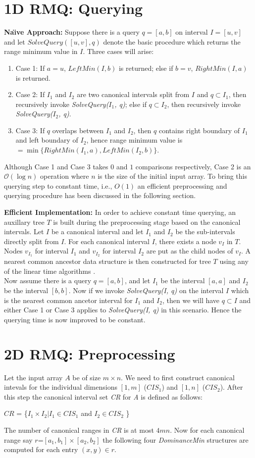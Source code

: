 \section{1D RMQ: Querying}
\textbf{Na\"{\i}ve Approach:} Suppose there is a query $q=[a, b]$ on interval $I=[u, v]$ and let $SolveQuery([u, v], q)$ denote the basic procedure which returns the range minimum value in $I$. Three cases will arise:
\begin{enumerate}
\item Case 1: If $a=u$, $LeftMin(I, b)$ is returned; else if $b=v$, $RightMin(I, a)$ is returned.
\item Case 2: If $I_1$ and $I_2$ are two canonical intervals split from $I$ and $q \subset I_1$, then recursively invoke \emph{SolveQuery($I_1$, q)}; else if $q \subset I_2$, then recursively invoke \emph{SolveQuery($I_2$, q)}.
\item Case 3: If $q$ overlaps between $I_1$ and $I_2$, then $q$ contains right boundary of $I_1$ and left boundary of $I_2$, hence range minimum value is $= \min \{ RightMin(I_1, a), LeftMin(I_2, b) \}$.
\end{enumerate}
Although Case 1 and Case 3 takes $0$ and $1$ comparisons respectively, Case 2 is an $\mathcal{O}( \log n)$ operation where $n$ is the size of the initial input array. To bring this querying step to constant time, i.e., $O(1)$ an efficient preprocessing and querying procedure has been discussed in the following section.\par 
\textbf{Efficient Implementation:}
In order to achieve constant time querying, an auxillary tree $T$ is built during the preprocessing stage based on the canonical intervals. Let $I$ be a canonical interval and let $I_1$ and $I_2$ be the sub-intervals directly split from $I$. For each canonical interval $I$, there exists a node $v_I$ in $T$. Nodes $v_{I_1}$ for interval $I_1$ and $v_{I_2}$ for interval $I_2$ are put as the child nodes of $v_I$. A nearest common ancestor data structure is then constructed for tree $T$ using any of the linear time algorithms \cite{p15, p13, p16, p4}.\\
Now assume there is a query $q=[a, b]$, and let $I_1$ be the interval $[a,a]$ and $I_2$ be the interval $[b,b]$. Now if we invoke \emph{SolveQuery(I, q)} on the interval $I$ which is the nearest common ancetor interval for $I_1$ and $I_2$, then we will have $q \subset I$ and either Case 1 or Case 3 applies to \emph{SolveQuery(I, q)} in this scenario. Hence the querying time is now improved to be constant. 
\section{2D RMQ: Preprocessing}
Let the input array $A$ be of size $m \times n$. We need to first construct canonical intevals for the individual dimensions $[1,m]$ ($CIS_1$) and $[1,n]$ ($CIS_2$). After this step the canonical interval set \emph{CR} for \emph{A} is defined as follows:
\begin{center}
$CR$ = \{$I_1 \times I_2 | I_1 \in CIS_1$ and $I_2 \in CIS_2$ \} 
\end{center}

The number of canonical ranges in \emph{CR} is at most $4mn$. Now for each canonical range say $r$=$[a_1,b_1] \times [a_2,b_2]$ the following four \emph{DominanceMin} structures are computed for each entry $(x,y) \in r$.\\

